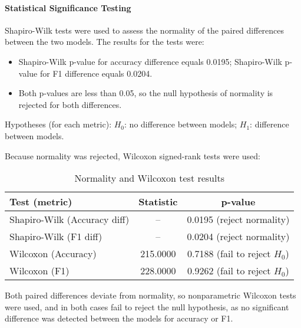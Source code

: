 \documentclass[conference]{IEEEtran}
\begin{document}
\paragraph{Statistical Significance Testing}

Shapiro-Wilk tests were used to assess the normality of the paired differences between the two models. The results
 for the tests were:
\begin{itemize}
  \item Shapiro-Wilk p-value for accuracy difference equals 0.0195; Shapiro-Wilk p-value for F1 difference equals 0.0204.
  \item Both p-values are less than 0.05, so the null hypothesis of normality is rejected for both differences.
\end{itemize}


Hypotheses (for each metric):
$H_0$: no difference between models; $H_1$: difference between models.

Because normality was rejected, Wilcoxon signed-rank tests were used:
\begin{table}[H]
  \centering
  \caption{Normality and Wilcoxon test results}
  \label{tab:stats_tests}
  \begin{tabular}{@{}l c c@{}}
    \toprule
 Test (metric) & Statistic & p-value \\
    \midrule
 Shapiro-Wilk (Accuracy diff) & -- & 0.0195 (reject normality) \\
 Shapiro-Wilk (F1 diff)       & -- & 0.0204 (reject normality) \\
 Wilcoxon (Accuracy)          & 215.0000 & 0.7188 (fail to reject $H_0$) \\
 Wilcoxon (F1)                & 228.0000 & 0.9262 (fail to reject $H_0$) \\
    \bottomrule
  \end{tabular}
\end{table}

Both paired differences deviate from normality, so nonparametric Wilcoxon tests were used, and in
 both cases fail to reject the null hypothesis, as no significant difference was detected between the models for
 accuracy or F1.
\end{document}

